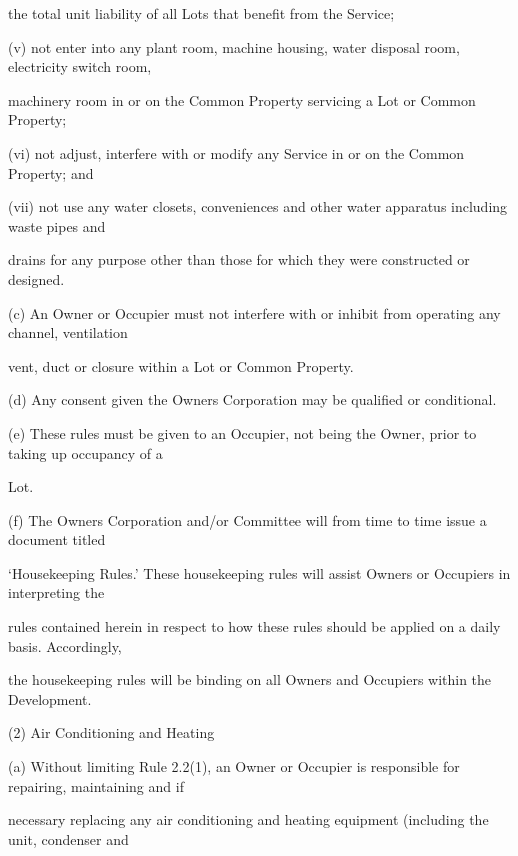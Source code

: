 \documentclass{article}
\begin{document}
{\fontsize{10.02}{1}the total unit liability of all Lots that benefit from the Service; }

{\fontsize{9.962}{1}(v) not enter into any plant room, machine housing, water disposal room, electricity switch room, }

{\fontsize{10.02}{1}machinery room in or on the Common Property servicing a Lot or Common Property; }

{\fontsize{9.962}{1}(vi) not adjust, interfere with or modify any Service in or on the Common Property; and }

{\fontsize{9.962}{1}(vii) not use any water closets, conveniences and other water apparatus including waste pipes and }

{\fontsize{10.02}{1}drains for any purpose other than those for which they were constructed or designed. }

{\fontsize{9.962}{1}(c) An Owner or Occupier must not interfere with or inhibit from operating any channel, ventilation }

{\fontsize{10.02}{1}vent, duct or closure within a Lot or Common Property. }

{\fontsize{9.962}{1}(d) Any consent given the Owners Corporation may be qualified or conditional. }

{\fontsize{9.962}{1}(e) These rules must be given to an Occupier, not being the Owner, prior to taking up occupancy of a }

{\fontsize{10.02}{1}Lot. }

{\fontsize{9.962}{1}(f) The Owners Corporation and/or Committee will from time to time issue a document titled }

{\fontsize{10.02}{1}‘Housekeeping Rules.’ These housekeeping rules will assist Owners or Occupiers in interpreting the }

{\fontsize{10.02}{1}rules contained herein in respect to how these rules should be applied on a daily basis. Accordingly, }

{\fontsize{10.02}{1}the housekeeping rules will be binding on all Owners and Occupiers within the Development. }

{\fontsize{9.962}{1}(2) Air Conditioning and Heating }

{\fontsize{9.962}{1}(a) Without limiting Rule 2.2(1), an Owner or Occupier is responsible for repairing, maintaining and if }

{\fontsize{10.02}{1}necessary replacing any air conditioning and heating equipment (including the unit, condenser and }
\end{document}
